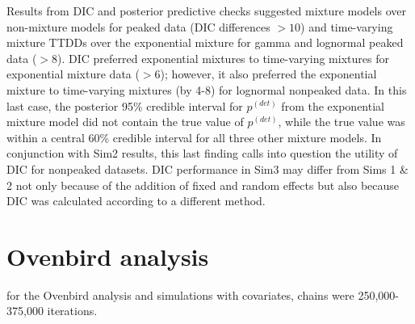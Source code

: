 \documentclass[useAMS,usenatbib,referee,12pt]{article}
\newcommand{\adam}[1]{{\color{blue} ADAM: #1}}
\begin{document}
Results from DIC and posterior predictive checks suggested mixture models over non-mixture models for peaked data (DIC differences $>10$) and time-varying mixture TTDDs over the exponential mixture for gamma and lognormal peaked data ($>8$).
DIC preferred exponential mixtures to time-varying mixtures for exponential mixture data ($>6$); however, it also preferred the exponential mixture to time-varying mixtures (by 4-8) for lognormal nonpeaked data.  
In this last case, the posterior 95\% credible interval for $p^{(det)}$ from the exponential mixture model did not contain the true value of $p^{(det)}$, while the true value was within a central 60\% credible interval for all three other mixture models.  
In conjunction with Sim2 results, this last finding calls into question the utility of DIC for nonpeaked datasets.
DIC performance in Sim3 may differ from Sims 1 \& 2 not only because of the addition of fixed and random effects but also because DIC was calculated according to a different method.








\section{Ovenbird analysis}\label{sec:ovenbirds}

for the Ovenbird analysis and simulations with covariates, chains were 250,000-375,000 iterations. 
\end{document}

